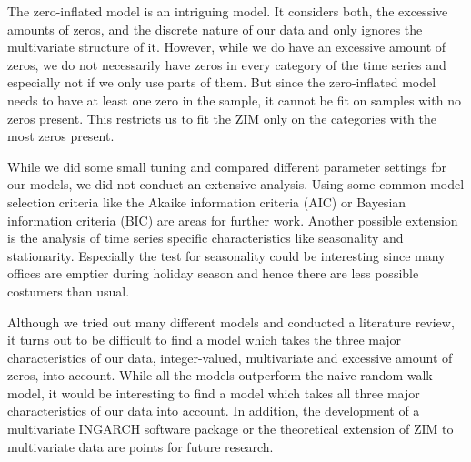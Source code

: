 The zero-inflated model is an intriguing model. It considers both, the excessive amounts of zeros, and the discrete nature of our data and only ignores the multivariate structure of it. However, while we do have an excessive amount of zeros, we do not necessarily have zeros in every category of the time series and especially not if we only use parts of them. But since the zero-inflated model needs to have at least one zero in the sample, it cannot be fit on samples with no zeros present. This restricts us to fit the ZIM only on the categories with the most zeros present. 

While we did some small tuning and compared different parameter settings for our models, we did not conduct an extensive analysis. Using some common model selection criteria like the Akaike information criteria (AIC) or Bayesian information criteria (BIC) are areas for further work. Another possible extension is the analysis of time series specific characteristics like seasonality and stationarity. Especially the test for seasonality could be interesting since many offices are emptier during holiday season and hence there are less possible costumers than usual. 

Although we tried out many different models and conducted a literature review, it turns out to be difficult to find a model which takes the three major characteristics of our data, integer-valued, multivariate and excessive amount of zeros, into account. While all the models outperform the naive random walk model, it would be interesting to find a model which takes all three major characteristics of our data into account. In addition, the development of a multivariate INGARCH software package or the theoretical extension of ZIM to multivariate data are points for future research. 